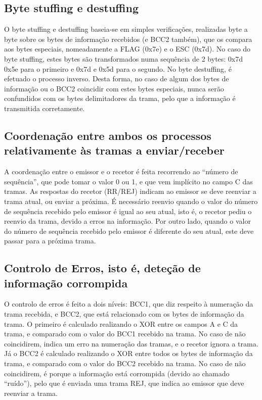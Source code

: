 \documentclass[article, a4paper, 11pt, oneside]{memoir}
\begin{document}
\subsection{Byte stuffing e destuffing}
O byte stuffing e destuffing baseia-se em simples verificações, realizadas byte a byte sobre os bytes de informação recebidos (e BCC2 também), 
que os compara aos bytes especiais, nomeadamente a FLAG (0x7e) e o ESC (0x7d). 
No caso do byte stuffing, estes bytes são transformados numa sequência de 2 bytes: 0x7d 0x5e para o primeiro e 0x7d e 0x5d para o segundo. 
No byte destuffing, é efetuado o processo inverso.
Desta forma, no caso de algum dos bytes de informação ou o BCC2 coincidir com estes bytes especiais, nunca serão confundidos com os bytes delimitadores da trama, 
pelo que a informação é transmitida corretamente.

\subsection{Coordenação entre ambos os processos relativamente às tramas a enviar/receber}
A coordenação entre o emissor e o recetor é feita recorrendo ao “número de sequência”,
 que pode tomar o valor 0 ou 1, e que vem implícito no campo C das tramas. 
 As respostas do recetor (RR/REJ) indicam ao emissor se deve reenviar a trama atual,
  ou enviar a próxima. É necessário reenvio quando o valor do número de sequência 
  recebido pelo emissor é igual ao seu atual, isto é, o recetor pediu o reenvio da trama, 
  devido a erros na informação. Por outro lado, quando o valor do número de sequência recebido 
  pelo emissor é diferente do seu atual, este deve passar para a próxima trama.

\subsection{Controlo de Erros, isto é, deteção de informação corrompida}
O controlo de erros é feito a dois níveis: BCC1, que diz respeito à numeração da trama recebida,
 e BCC2, que está relacionado com os bytes de informação da trama. 
 O primeiro é calculado realizando o XOR entre os campos A e C da trama, 
 e comparado com o valor do BCC1 recebido na trama. No caso de não coincidirem, 
 indica um erro na numeração das tramas, e o recetor ignora a trama. Já o BCC2 é 
 calculado realizando o XOR entre todos os bytes de informação da trama, e 
 comparado com o valor do BCC2 recebido na trama. No caso de não coincidirem, 
 é porque a informação está corrompida (devido ao chamado “ruído”), 
 pelo que é enviada uma trama REJ, que indica ao emissor que deve reenviar a trama.
\end{document}
